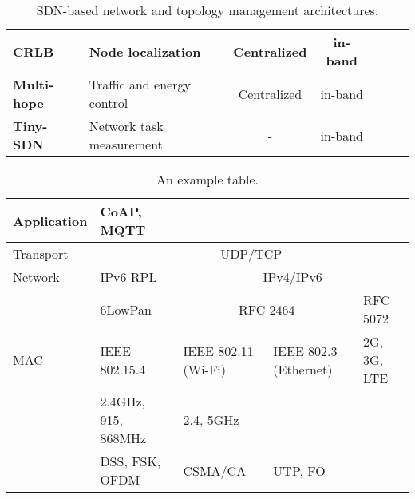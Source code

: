 \begin{table}[h!]
\begin{tabulary}{\columnwidth}{L|L|C|C|C|C|C}
	\textbf{CRLB}                                    & Node localization                      & Centralized                       & in-band                  &                                       &                                       & \\\hline
	\textbf{Multi-hope}                              & Traffic and energy control             & Centralized                       & in-band                  &                                       &                                       & \ok                              \\\hline
	\textbf{Tiny-SDN}                                & Network task measurement               & -                                 & in-band                  &                                       &                                       & \\
	\end{tabulary}
	\caption{\label{tab:Tableuy} SDN-based network and topology management architectures. \cite{ndiaye_software_2017}}
\end{table}

\begin{table}[h!]
\scriptsize
	\begin{tabular}{l|l|l|l|l}
	Application & CoAP, MQTT          &                     &                       &            \\\hline
	Transport   & \multicolumn{4}{c}{UDP/TCP}                                                    \\\hline
	Network     & IPv6 RPL            & \multicolumn{3}{c}{IPv4/IPv6}                            \\\hline
	\           & 6LowPan             & \multicolumn{2}{c}{RFC 2464}                & RFC 5072   \\\hline
	MAC         & IEEE 802.15.4       & IEEE 802.11 (Wi-Fi) & IEEE 802.3 (Ethernet) & 2G, 3G, LTE\\\hline
	\           & 2.4GHz, 915, 868MHz & 2.4, 5GHz           &                       &            \\\hline
	\           & DSS, FSK, OFDM      & CSMA/CA             & UTP, FO               &            \\\hline
	\end{tabular}
	\caption{\label{tab:Table} An example table.}
\end{table}

